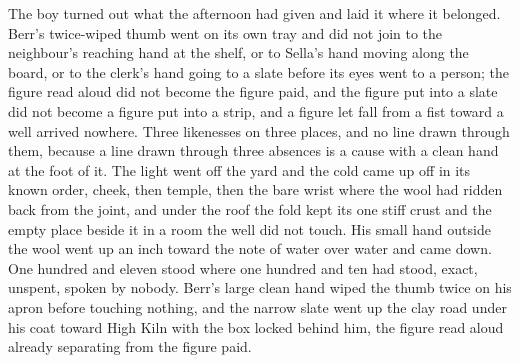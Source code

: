 The boy turned out what the afternoon had given and laid it where it belonged. Berr's twice-wiped thumb went on its own tray and did not join to the neighbour's reaching hand at the shelf, or to Sella's hand moving along the board, or to the clerk's hand going to a slate before its eyes went to a person; the figure read aloud did not become the figure paid, and the figure put into a slate did not become a figure put into a strip, and a figure let fall from a fist toward a well arrived nowhere. Three likenesses on three places, and no line drawn through them, because a line drawn through three absences is a cause with a clean hand at the foot of it. The light went off the yard and the cold came up off  in its known order, cheek, then temple, then the bare wrist where the wool had ridden back from the joint, and under the roof the fold kept its one stiff crust and the empty place beside it in a room the well did not touch. His small hand outside the wool went up an inch toward the note of water over water and came down. One hundred and eleven stood where one hundred and ten had stood, exact, unspent, spoken by nobody. Berr's large clean hand wiped the thumb twice on his apron before touching nothing, and the narrow slate went up the clay road under his coat toward High Kiln with the box locked behind him, the figure read aloud already separating from the figure paid.
